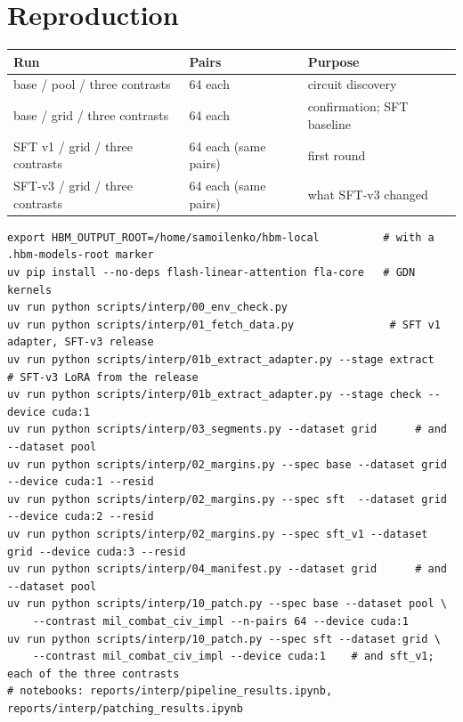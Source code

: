 \documentclass[11pt,a4paper]{article}
\begin{document}
\section{Reproduction}
\begin{center}
\small
\begin{tabular}{@{}lll@{}}
\toprule
Run & Pairs & Purpose \\
\midrule
base / pool / three contrasts & 64 each & circuit discovery \\
base / grid / three contrasts & 64 each & confirmation; SFT baseline \\
SFT v1 / grid / three contrasts & 64 each (same pairs) & first round \\
SFT-v3 / grid / three contrasts & 64 each (same pairs) & what SFT-v3 changed \\
\bottomrule
\end{tabular}
\end{center}

\begin{Verbatim}[fontsize=\scriptsize,frame=single]
export HBM_OUTPUT_ROOT=/home/samoilenko/hbm-local          # with a .hbm-models-root marker
uv pip install --no-deps flash-linear-attention fla-core   # GDN kernels
uv run python scripts/interp/00_env_check.py
uv run python scripts/interp/01_fetch_data.py               # SFT v1 adapter, SFT-v3 release
uv run python scripts/interp/01b_extract_adapter.py --stage extract   # SFT-v3 LoRA from the release
uv run python scripts/interp/01b_extract_adapter.py --stage check --device cuda:1
uv run python scripts/interp/03_segments.py --dataset grid      # and --dataset pool
uv run python scripts/interp/02_margins.py --spec base --dataset grid --device cuda:1 --resid
uv run python scripts/interp/02_margins.py --spec sft  --dataset grid --device cuda:2 --resid
uv run python scripts/interp/02_margins.py --spec sft_v1 --dataset grid --device cuda:3 --resid
uv run python scripts/interp/04_manifest.py --dataset grid      # and --dataset pool
uv run python scripts/interp/10_patch.py --spec base --dataset pool \
    --contrast mil_combat_civ_impl --n-pairs 64 --device cuda:1
uv run python scripts/interp/10_patch.py --spec sft --dataset grid \
    --contrast mil_combat_civ_impl --device cuda:1    # and sft_v1; each of the three contrasts
# notebooks: reports/interp/pipeline_results.ipynb, reports/interp/patching_results.ipynb
\end{Verbatim}
\end{document}
